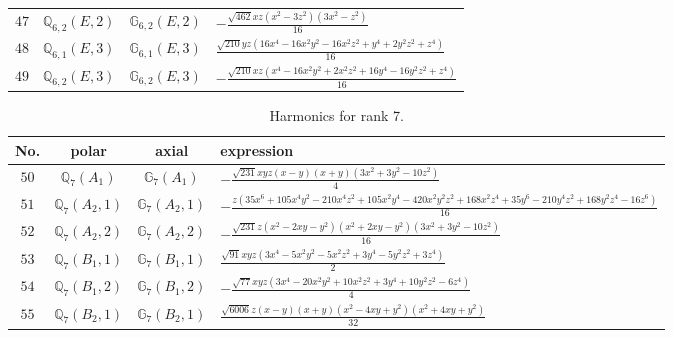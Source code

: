 \documentclass[fleqn,8pt,landscape]{jsarticle}
\begin{document}
\begin{table}[ht!]
\begin{center}
\begin{tabular}{cccl}
$ 47 $ & $ \mathbb{Q}_{6,2}(E,2) $ & $ \mathbb{G}_{6,2}(E,2) $ & $ - \frac{\sqrt{462} x z \left(x^{2} - 3 z^{2}\right) \left(3 x^{2} - z^{2}\right)}{16} $ \\
$ 48 $ & $ \mathbb{Q}_{6,1}(E,3) $ & $ \mathbb{G}_{6,1}(E,3) $ & $ \frac{\sqrt{210} y z \left(16 x^{4} - 16 x^{2} y^{2} - 16 x^{2} z^{2} + y^{4} + 2 y^{2} z^{2} + z^{4}\right)}{16} $ \\
$ 49 $ & $ \mathbb{Q}_{6,2}(E,3) $ & $ \mathbb{G}_{6,2}(E,3) $ & $ - \frac{\sqrt{210} x z \left(x^{4} - 16 x^{2} y^{2} + 2 x^{2} z^{2} + 16 y^{4} - 16 y^{2} z^{2} + z^{4}\right)}{16} $ \\
 \hline \hline
\end{tabular}
\end{center}
\end{table}
\begin{table}[ht!]
\begin{center}
\caption{Harmonics for rank 7.}
\renewcommand{\arraystretch}{1.3}
\begin{tabular}{cccl} \hline \hline
No. & polar & axial & expression \\ \hline
$ 50 $ & $ \mathbb{Q}_{7}(A_{1}) $ & $ \mathbb{G}_{7}(A_{1}) $ & $ - \frac{\sqrt{231} x y z \left(x - y\right) \left(x + y\right) \left(3 x^{2} + 3 y^{2} - 10 z^{2}\right)}{4} $ \\
$ 51 $ & $ \mathbb{Q}_{7}(A_{2},1) $ & $ \mathbb{G}_{7}(A_{2},1) $ & $ - \frac{z \left(35 x^{6} + 105 x^{4} y^{2} - 210 x^{4} z^{2} + 105 x^{2} y^{4} - 420 x^{2} y^{2} z^{2} + 168 x^{2} z^{4} + 35 y^{6} - 210 y^{4} z^{2} + 168 y^{2} z^{4} - 16 z^{6}\right)}{16} $ \\
$ 52 $ & $ \mathbb{Q}_{7}(A_{2},2) $ & $ \mathbb{G}_{7}(A_{2},2) $ & $ - \frac{\sqrt{231} z \left(x^{2} - 2 x y - y^{2}\right) \left(x^{2} + 2 x y - y^{2}\right) \left(3 x^{2} + 3 y^{2} - 10 z^{2}\right)}{16} $ \\
$ 53 $ & $ \mathbb{Q}_{7}(B_{1},1) $ & $ \mathbb{G}_{7}(B_{1},1) $ & $ \frac{\sqrt{91} x y z \left(3 x^{4} - 5 x^{2} y^{2} - 5 x^{2} z^{2} + 3 y^{4} - 5 y^{2} z^{2} + 3 z^{4}\right)}{2} $ \\
$ 54 $ & $ \mathbb{Q}_{7}(B_{1},2) $ & $ \mathbb{G}_{7}(B_{1},2) $ & $ - \frac{\sqrt{77} x y z \left(3 x^{4} - 20 x^{2} y^{2} + 10 x^{2} z^{2} + 3 y^{4} + 10 y^{2} z^{2} - 6 z^{4}\right)}{4} $ \\
$ 55 $ & $ \mathbb{Q}_{7}(B_{2},1) $ & $ \mathbb{G}_{7}(B_{2},1) $ & $ \frac{\sqrt{6006} z \left(x - y\right) \left(x + y\right) \left(x^{2} - 4 x y + y^{2}\right) \left(x^{2} + 4 x y + y^{2}\right)}{32} $ \\

\end{tabular}
\end{center}
\end{table}
\end{document}
